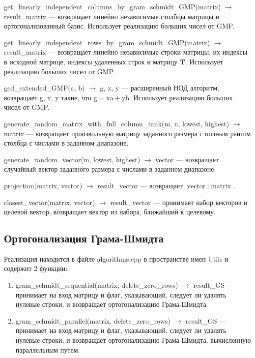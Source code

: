get\_linearly\_independent\_columns\_by\_gram\_schmidt\_GMP(matrix) $ \rightarrow $ result\_matrix --- возвращает линейно независимые столбцы матрицы и ортогонализованный базис. Использует реализацию больших чисел от GMP.

get\_linearly\_independent\_rows\_by\_gram\_schmidt\_GMP(matrix) $ \rightarrow $ result\_matrix --- возвращает линейно независимые строки матрицы, их индексы в исходной матрице, индексы удаленных строк и матрицу $ \mathbf{T} $. Использует реализацию больших чисел от GMP.

gcd\_extended\_GMP(a, b) $ \rightarrow $ g, x, y --- расширенный НОД алгоритм, возвращает g, x, y такие, что $ \mathrm{g} = \mathrm{xa} + \mathrm{yb} $.  Использует реализацию больших чисел от GMP.

generate\_random\_matrix\_with\_full\_column\_rank(m, n, lowest, highest) $ \rightarrow $ matrix --- возвращает произвольную матрицу заданного размера с полным рангом столбца с числами в заданном диапазоне.

generate\_random\_vector(m, lowest, highest) $ \rightarrow $ vector --- возвращает случайный вектор заданного размера с числами в заданном диапазоне.

projection(matrix, vector) $ \rightarrow $ result\_vector --- возвращает $ \text{vector} \perp \text{matrix} $.

closest\_vector(matrix, vector) $ \rightarrow $ result\_vector --- принимает набор векторов и целевой вектор, возвращает вектор из набора, ближайший к целевому.


\subsection{Ортогонализация Грама-Шмидта}

Реализация находится в файле algorithms.cpp в пространстве имен Utils и содержит 2 функции:

\begin{enumerate}

\item gram\_schmidt\_sequential(matrix, delete\_zero\_rows) $ \rightarrow $ result\_GS --- принимает на вход матрицу и флаг, указывающий, следует ли удалять нулевые строки, и возвращает ортогонализацию Грама-Шмидта.

\item gram\_schmidt\_parallel(matrix, delete\_zero\_rows) $ \rightarrow $ result\_GS --- принимает на вход матрицу и флаг, указывающий, следует ли удалять нулевые строки, и возвращает ортогонализацию Грама-Шмидта, вычисленную параллельным путем.

\end{enumerate}

